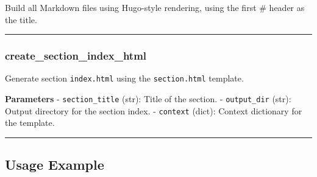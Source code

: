 \begin{Shaded}
\begin{Highlighting}[]
\end{Highlighting}
\end{Shaded}

Build all Markdown files using Hugo-style rendering, using the first \#
header as the title.

\begin{center}\rule{0.5\linewidth}{0.5pt}\end{center}

\subsubsection{create\_section\_index\_html}\label{create_section_index_html}

\begin{Shaded}
\begin{Highlighting}[]
\NormalTok{)}
\end{Highlighting}
\end{Shaded}

Generate section \texttt{index.html} using the \texttt{section.html}
template.

\textbf{Parameters} - \texttt{section\_title} (str): Title of the
section. - \texttt{output\_dir} (str): Output directory for the section
index. - \texttt{context} (dict): Context dictionary for the template.

\begin{center}\rule{0.5\linewidth}{0.5pt}\end{center}

\subsection{Usage Example}\label{usage-example}

\begin{Shaded}
\begin{Highlighting}[]
\end{Highlighting}
\end{Shaded}

